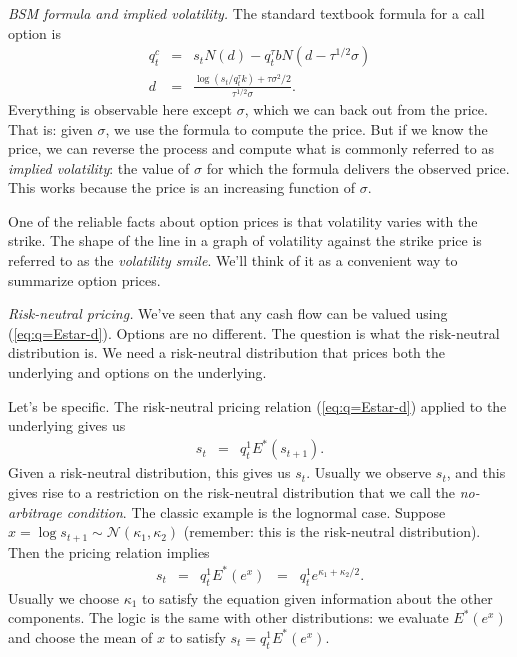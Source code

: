 \documentclass[11pt]{article}
\begin{document}
{\it BSM formula and implied volatility.\/}
The standard textbook formula for a call option is
\begin{eqnarray*}
        q^c_t &=& s_t N(d) - q^\tau_t b N (d - \tau^{1/2}\sigma ) \\
          d &=& \frac{\log(s_t/q^\tau_t k) + \tau \sigma^2/2}{\tau^{1/2}\sigma} .
\end{eqnarray*}
Everything is observable here except $\sigma$, which
we can back out from the price.
That is: given $\sigma$, we use the formula to compute the price.
But if we know the price, we can reverse the process and compute what is
commonly referred to as
{\it implied volatility\/}:  the value of $\sigma$ for which the formula
delivers the observed price.
This works because the price is an increasing function of $\sigma$.

One of the reliable facts about option prices is that volatility varies with the strike.
The shape of the line in a  graph of volatility against the strike price
is referred to as the {\it volatility smile\/}.
We'll think of it as a convenient way to summarize option prices.

{\it Risk-neutral pricing.\/}
We've seen that any cash flow can be valued using (\ref{eq:q=Estar-d}).
Options are no different.
The question is what the risk-neutral distribution is.
We need a risk-neutral distribution that prices both the underlying
and options on the underlying.

Let's be specific.
The risk-neutral pricing relation (\ref{eq:q=Estar-d})
applied to the underlying gives us
\begin{eqnarray*}
    s_t &=& q^1_t  E^* (s_{t+1}) .
\end{eqnarray*}
Given a risk-neutral distribution, this gives us $s_t$.
Usually we observe $s_t$, and this gives rise to a restriction
on the risk-neutral distribution that we call the
{\it no-arbitrage condition\/}.
%
The classic example is the lognormal case.
Suppose $x = \log s_{t+1} \sim \mathcal{N}(\kappa_1, \kappa_2)$
(remember:  this is the risk-neutral distribution).
Then the pricing relation implies
\begin{eqnarray*}
    s_t &=& q^1_t E^* (e^{x}) \;\;=\;\; q^1_t  e^{\kappa_1 + \kappa_2/2} .
\end{eqnarray*}
Usually we choose $\kappa_1$ to satisfy the equation given information
about the other components.
The logic is the same with other distributions:
we evaluate $E^*(e^x)$ and choose the mean of $x$ to satisfy $ s_t = q^1_t E^*(e^x)$.
\end{document}
